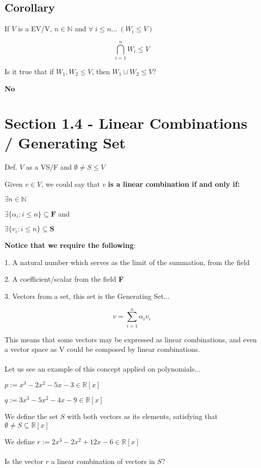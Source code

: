 \documentclass{article}
\begin{document}
\subsection*{Corollary}

If \(V\) is a EV/V, \(n \in \mathbb{N}\) and \(\forall\; i \leq n...\;(W_i \leq V )\)

\[
\bigcap_{i=1}^n W_i \leq V
\]

Is it true that if \(W_1, W_2 \leq V\), then \(W_1\cup W_2 \leq V\)?

\textbf{No}

\section*{Section 1.4 - Linear Combinations / Generating Set}

Def. \(V\) as a VS/F and \(\emptyset \neq S \leq V\)

Given \(v\in V\), we could say that \(v\) \textbf{is a linear combination if and only if:}

\(\exists n \in \mathbb{N}\) 

\(\exists \{\alpha_i : i\leq n \} \subseteq \textbf{F}\) and

\(\exists \{v_i : i\leq n\} \subseteq \textbf{S}\)

\textbf{Notice that we require the following}:

1. A natural number which serves as the limit of the summation,  from the field 

2. A coefficient/scalar from the field \textbf{F} 

3. Vectors from a set, this set is the Generating Set...

\[
v = \sum_{i=1}^{n} \alpha_i v_i
\]

This means that some vectors may be expressed as linear combinations, and even a vector space as V could be composed by linear combinations.
\\
\\
Let us see an example of this concept applied on polynomials...

\(p := x^3 - 2x^2 - 5x - 3 \in \mathbb{R}[x]\)

\(q := 3x^3 - 5x^2 - 4x - 9 \in \mathbb{R}[x]\)

We define the set \(S\) with both vectors as its elements, satisfying that \(\emptyset \neq S \subseteq \mathbb{R}[x]\)

We define \(r := 2x^3 - 2x^2 + 12x - 6 \in \mathbb{R}[x]\)
\\
\\
Is the vector \(r\) a linear combination of vectors in \(S\)?
\end{document}
